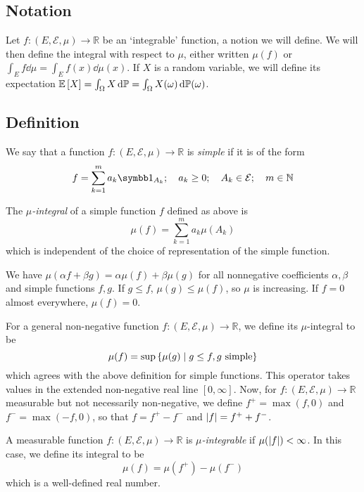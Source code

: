 \subsection{Notation}
Let \( f \colon (E, \mathcal E, \mu) \to \mathbb R \) be an `integrable' function, a notion we will define.
We will then define the integral with respect to \( \mu \), either written \( \mu(f) \) or \( \int_E f \dd{\mu} = \int_E f(x) \dd{\mu(x)} \).
If \( X \) is a random variable, we will define its expectation \( \mathbb{E}\left[{X}\right] = \int_\Omega X \dd{\mathbb P} = \int_\Omega X(\omega) \dd{\mathbb P(\omega)} \).

\subsection{Definition}
We say that a function \( f \colon (E,\mathcal E,\mu) \to \mathbb R \) is \emph{simple} if it is of the form
\[ f = \sum_{k=1}^m a_k \symbb 1_{A_k};\quad a_k \geq 0;\quad A_k \in \mathcal E;\quad m \in \mathbb N \]
\begin{definition}
	The \emph{\( \mu \)-integral} of a simple function \( f \) defined as above is
	\[ \mu(f) = \sum_{k=1}^m a_k \mu(A_k) \]
	which is independent of the choice of representation of the simple function.
\end{definition}
\begin{remark}
	We have \( \mu(\alpha f + \beta g) = \alpha \mu(f) + \beta \mu(g) \) for all nonnegative coefficients \( \alpha, \beta \) and simple functions \( f, g \).
	If \( g \leq f \), \( \mu(g) \leq \mu(f) \), so \( \mu \) is increasing.
	If \( f = 0 \) almost everywhere, \( \mu(f) = 0 \).
\end{remark}
For a general non-negative function \( f \colon (E,\mathcal E,\mu) \to \mathbb R \), we define its \( \mu \)-integral to be
\[ \mu(f) = \sup\qty{\mu(g) \mid g \leq f, g \text{ simple}} \]
which agrees with the above definition for simple functions.
This operator takes values in the extended non-negative real line \( [0,\infty] \).
Now, for \( f \colon (E,\mathcal E,\mu) \to \mathbb R \) measurable but not necessarily non-negative, we define \( f^+ = \max(f,0) \) and \( f^- = \max(-f,0) \), so that \( f = f^+ - f^- \) and \( \abs{f} = f^+ + f^- \).
\begin{definition}
	A measurable function \( f \colon (E,\mathcal E,\mu) \to \mathbb R \) is \emph{\( \mu \)-integrable} if \( \mu(\abs{f}) < \infty \).
	In this case, we define its integral to be
	\[ \mu(f) = \mu(f^+) - \mu(f^-) \]
	which is a well-defined real number.
\end{definition}

